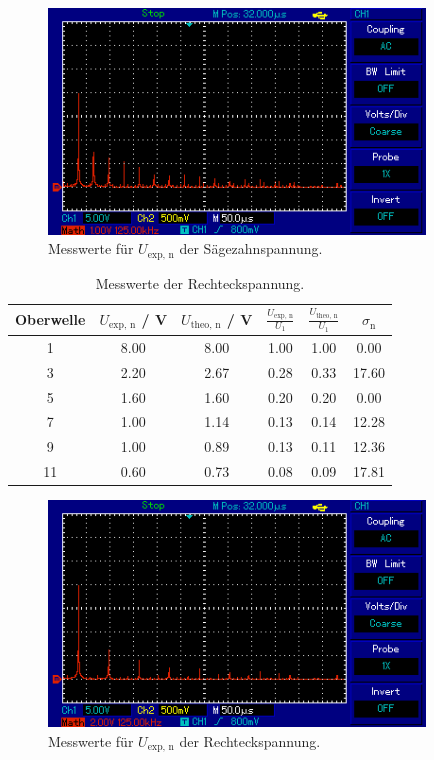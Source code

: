 \begin{figure}[H]
  \centering
  \includegraphics[height=6cm]{picture/SaegeB.PNG}
  \caption{Messwerte für $U_\text{exp, n}$ der Sägezahnspannung.}
  \label{fig:SägeB}
\end{figure}

\begin{table}[H] %
  \centering
  \begin{tabular}{c | c | c | c | c |c}
    \toprule
    Oberwelle & $U_\text{exp, n}$ / V & $U_\text{theo, n}$ / V & $\frac{U_\text{exp, n}}{U_1}$ & $\frac{U_\text{theo, n}}{U_1}$ & $\sigma_\text{n}$ \\
    \midrule
    1  & 8.00 & 8.00 & 1.00 & 1.00 & 0.00 \\
    3  & 2.20 & 2.67 & 0.28 & 0.33 & 17.60\\
    5  & 1.60 & 1.60 & 0.20 & 0.20 & 0.00 \\
    7  & 1.00 & 1.14 & 0.13 & 0.14 & 12.28\\
    9  & 1.00 & 0.89 & 0.13 & 0.11 & 12.36\\
    11 & 0.60 & 0.73 & 0.08 & 0.09 & 17.81\\
    \bottomrule
  \end{tabular}
  \caption{Messwerte der Rechteckspannung.}
  \label{tab:Recht}
\end{table}

\begin{figure}[H]
  \centering
  \includegraphics[height=6cm]{picture/RechteckB.PNG}
  \caption{Messwerte für $U_\text{exp, n}$ der Rechteckspannung.}
\end{figure}

